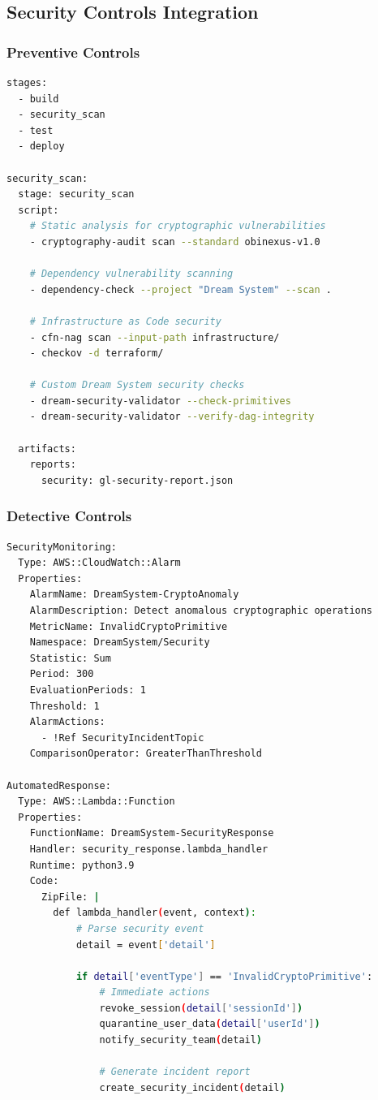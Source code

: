 \documentclass[12pt,a4paper]{article}
\begin{document}
\subsection{Security Controls Integration}

\subsubsection{Preventive Controls}

\begin{lstlisting}[language=sh, caption=CI/CD Security Pipeline]
stages:
  - build
  - security_scan
  - test
  - deploy

security_scan:
  stage: security_scan
  script:
    # Static analysis for cryptographic vulnerabilities
    - cryptography-audit scan --standard obinexus-v1.0
    
    # Dependency vulnerability scanning
    - dependency-check --project "Dream System" --scan .
    
    # Infrastructure as Code security
    - cfn-nag scan --input-path infrastructure/
    - checkov -d terraform/
    
    # Custom Dream System security checks
    - dream-security-validator --check-primitives
    - dream-security-validator --verify-dag-integrity
    
  artifacts:
    reports:
      security: gl-security-report.json
\end{lstlisting}

\subsubsection{Detective Controls}

\begin{lstlisting}[language=sh, caption=Runtime Security Monitoring]
SecurityMonitoring:
  Type: AWS::CloudWatch::Alarm
  Properties:
    AlarmName: DreamSystem-CryptoAnomaly
    AlarmDescription: Detect anomalous cryptographic operations
    MetricName: InvalidCryptoPrimitive
    Namespace: DreamSystem/Security
    Statistic: Sum
    Period: 300
    EvaluationPeriods: 1
    Threshold: 1
    AlarmActions:
      - !Ref SecurityIncidentTopic
    ComparisonOperator: GreaterThanThreshold

AutomatedResponse:
  Type: AWS::Lambda::Function
  Properties:
    FunctionName: DreamSystem-SecurityResponse
    Handler: security_response.lambda_handler
    Runtime: python3.9
    Code:
      ZipFile: |
        def lambda_handler(event, context):
            # Parse security event
            detail = event['detail']
            
            if detail['eventType'] == 'InvalidCryptoPrimitive':
                # Immediate actions
                revoke_session(detail['sessionId'])
                quarantine_user_data(detail['userId'])
                notify_security_team(detail)
                
                # Generate incident report
                create_security_incident(detail)
\end{lstlisting}
\end{document}

